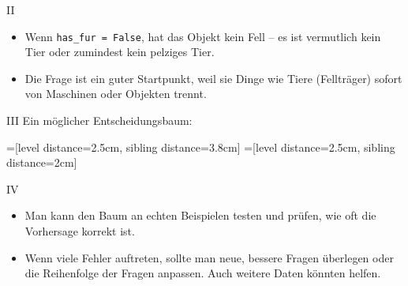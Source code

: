 \begin{aufgabe}{II}
\begin{itemize}
  \item Wenn \texttt{has\_fur = False}, hat das Objekt kein Fell – es ist vermutlich kein Tier oder zumindest kein pelziges Tier.
  \item Die Frage ist ein guter Startpunkt, weil sie Dinge wie Tiere (Fellträger) sofort von Maschinen oder Objekten trennt.
\end{itemize}
\end{aufgabe}

\begin{aufgabe}{III}
Ein möglicher Entscheidungsbaum:

\centering
{}=[level distance=2.5cm, sibling distance=3.8cm]
=[level distance=2.5cm, sibling distance=2cm]

\end{aufgabe}

\begin{aufgabe}{IV}
\begin{itemize}
\item Man kann den Baum an echten Beispielen testen und prüfen, wie oft die Vorhersage korrekt ist.
\item Wenn viele Fehler auftreten, sollte man neue, bessere Fragen überlegen oder die Reihenfolge der Fragen anpassen. Auch weitere Daten könnten helfen.
\end{itemize}
\end{aufgabe}